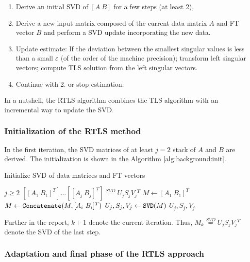 \documentclass[/home/francois/latex/report/main.tex]{subfiles}
\begin{document}
\begin{enumerate}
  \item Derive an initial \ac{SVD} of $[A \ B]$ for a few steps (at least 2),
  \item Derive a new input matrix composed of the current data matrix $A$ and \ac{FT} vector $B$ and perform a \ac{SVD} update incorporating the new data.
  \item Update estimate: If the deviation between the smallest singular values is less than a small $\varepsilon$ (of the order of the machine precision); transform left singular vectors; compute \ac{TLS} solution from the left singular vectors.
  \item Continue with 2. or stop estimation.
\end{enumerate}

In a nutshell, the \ac{RTLS} algorithm combines the \ac{TLS} algorithm with an incremental way to update the \ac{SVD}.

\subsubsection{Initialization of the \ac{RTLS} method}

In the first iteration, the \ac{SVD} matrices of at least $j=2$ stack of $A$ and $B$ are derived. The initialization is shown in the Algorithm \ref{alg:background:init}.

\begin{algorithm}
\caption{Initialize \ac{SVD} of data matrices and \ac{FT} vectors\label{alg:background:init}}
\begin{algorithmic}
\REQUIRE $j \geq 2$
\ENSURE $[[A_1 \ B_1]^T] \ldots [[A_j \ B_j]^T] \overset{SVD}{=} U_j S_j V_j {}^T$
\STATE $M \leftarrow [A_1 \ B_1]^T$
 \STATE $M \leftarrow \text{\texttt{Concatenate}}(M, [A_i \ B_i]^T)$
\ENDFOR
\STATE $U_j, S_j, V_j \leftarrow \text{\texttt{SVD}}(M)$
\RETURN $U_j, S_j, V_j$
\end{algorithmic}
\end{algorithm}

Further in the report, $k+1$ denote the current iteration. Thus, $M_k \overset{SVD}{=} U_j S_j V_j {}^T$ denote the \ac{SVD} of the last step.

\subsubsection{Adaptation and final phase of the \ac{RTLS} approach}
\end{document}
